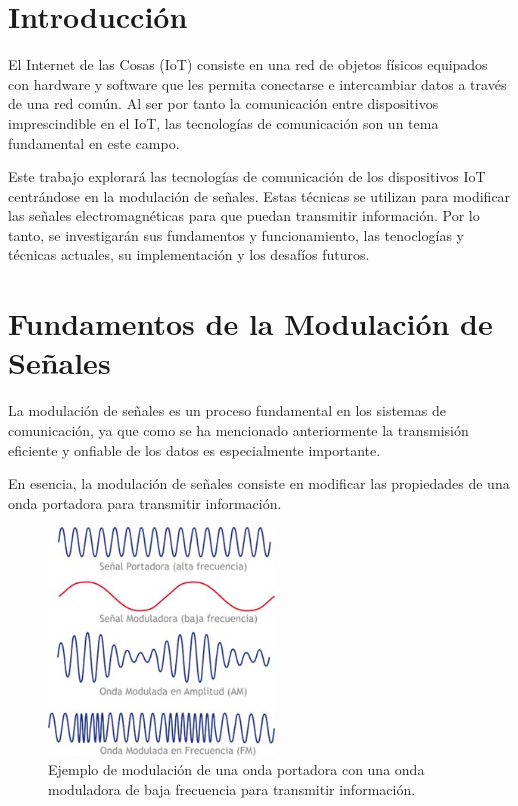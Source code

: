 \documentclass[12pt, letterpaper]{article}
\title{\doctitle}
\author{Juan Luis Serradilla Tormos}
\date{\monthname[\month] de \the\year}
\begin{document}
\pagestyle{fancy}

\maketitle

\newpage
\tableofcontents

\newpage
\section{Introducción}
El Internet de las Cosas (IoT) consiste en una red de objetos físicos equipados con hardware y software que les permita conectarse e intercambiar datos a través de una red común. Al ser por tanto la comunicación entre dispositivos imprescindible en el IoT, las tecnologías de comunicación son un tema fundamental en este campo.

Este trabajo explorará las tecnologías de comunicación de los dispositivos IoT centrándose en la modulación de señales. Estas técnicas se utilizan para modificar las señales electromagnéticas para que puedan transmitir información. Por lo tanto, se investigarán sus fundamentos y funcionamiento, las tenoclogías y técnicas actuales, su implementación y los desafíos futuros.


\vspace{1em}
\section{Fundamentos de la Modulación de Señales}

La modulación de señales es un proceso fundamental en los sistemas de comunicación, ya que como se ha mencionado anteriormente la transmisión eficiente y onfiable de los datos es especialmente importante.

En esencia, la modulación de señales consiste en modificar las propiedades de una onda portadora para transmitir información. 

\newpage
\begin{figure}[h]
    \centering
    \includegraphics[width=6cm]{images/modulacion_ejemplo.jpg}
    \caption{Ejemplo de modulación de una onda portadora con una onda moduladora de baja frecuencia para transmitir información.}
    \label{fig:modulacion_ejemplo}
\end{figure}
\end{document}
